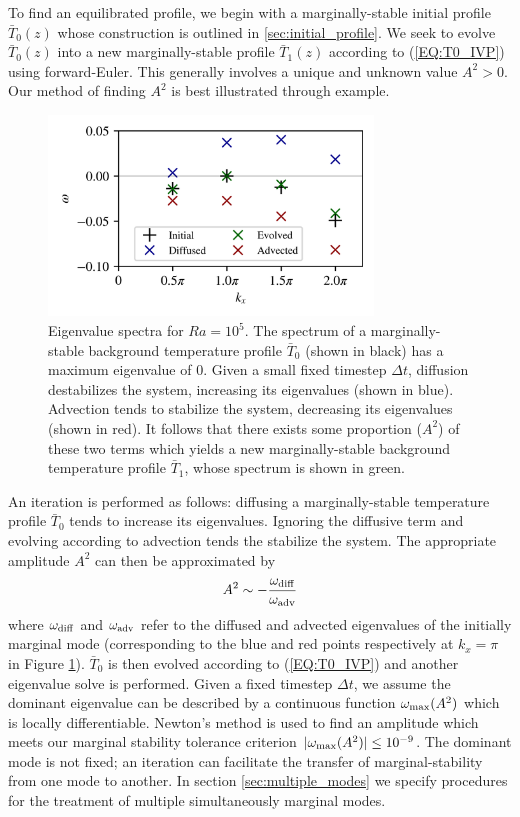 \documentclass[reprint,amsmath,amssymb,aps]{revtex4-1}
\begin{document}
\par To find an equilibrated profile, we begin with a marginally-stable initial profile $\bar{T}_0(z)$ whose construction is outlined in \ref{sec:initial_profile}. We seek to evolve $\bar{T}_0(z)$ into a new marginally-stable profile $\bar{T}_1(z)$ according to (\ref{EQ:T0_IVP}) using forward-Euler. This generally involves a unique and unknown value $A^2 > 0$. Our method of finding $A^2$ is best illustrated through example.

\begin{figure}[h]
    \includegraphics[width=3.4in]{EV_spectrum_ol.png}
    \caption{Eigenvalue spectra for $Ra = 10^5$. The spectrum of a marginally-stable background temperature profile $\bar{T}_0$ (shown in black) has a maximum eigenvalue of 0. Given a small fixed timestep $\Delta t$, diffusion destabilizes the system, increasing its eigenvalues (shown in blue). Advection tends to stabilize the system, decreasing its eigenvalues (shown in red). It follows that there exists some proportion ($A^2$) of these two terms which yields a new marginally-stable background temperature profile $\bar{T}_1$, whose spectrum is shown in green.}
    \label{fig:iteration_spectra} 
\end{figure}

An iteration is performed as follows: diffusing a marginally-stable temperature profile $\bar{T}_0$ tends to increase its eigenvalues. Ignoring the diffusive term and evolving according to advection tends the stabilize the system. The appropriate amplitude $A^2$ can then be approximated by
\begin{equation}
    A^2 \sim -\frac{\omega_{\rm{diff}}}{\omega_{\rm{adv}}}
\end{equation}
where $\omega_{\rm{diff}}$ and $\omega_{\rm{adv}}$ refer to the diffused and advected eigenvalues of the initially marginal mode (corresponding to the blue and red points respectively at $k_x = \pi$ in Figure \ref{fig:iteration_spectra}). $\bar{T}_0$ is then evolved according to (\ref{EQ:T0_IVP}) and another eigenvalue solve is performed. Given a fixed timestep $\Delta t$, we assume the dominant eigenvalue can be described by a continuous function $\omega_{\rm{max}} (A^2)$ which is locally differentiable. Newton's method is used to find an amplitude which meets our marginal stability tolerance criterion $|\omega_{\rm{max}} (A^2)| \leq 10^{-9}$. The dominant mode is not fixed; an iteration can facilitate the transfer of marginal-stability from one mode to another. In section \ref{sec:multiple_modes} we specify procedures for the treatment of multiple simultaneously marginal modes.
\end{document}
